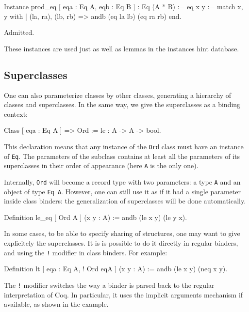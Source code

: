 \begin{coq_example*}
Instance prod_eq [ eqa : Eq A, eqb : Eq B ] : Eq (A * B) :=
  eq x y := match x, y with
  | (la, ra), (lb, rb) => andb (eq la lb) (eq ra rb)
  end.
\end{coq_example*}
\begin{coq_eval}
Admitted.
\end{coq_eval}

These instances are used just as well as lemmas in the instances hint database.


\subsection{Superclasses}
\label{classes:superclasses}
One can also parameterize classes by other classes, generating a
hierarchy of classes and superclasses. In the same way, we give the
superclasses as a binding context:

\begin{coq_example}
Class [ eqa : Eq A ] => Ord :=
  le : A -> A -> bool.
\end{coq_example}

This declaration means that any instance of the \texttt{Ord} class must
have an instance of \texttt{Eq}. The parameters of the subclass contains
at least all the parameters of its superclasses in their order of
appearance (here \texttt{A} is the only one). 

Internally, \texttt{Ord} will become a record type with two parameters:
a type \texttt{A} and an object of type \texttt{Eq A}. However, one can
still use it as if it had a single parameter inside class binders: the
generalization of superclasses will be done automatically. 
\begin{coq_example}
Definition le_eq [ Ord A ] (x y : A) :=
  andb (le x y) (le y x).
\end{coq_example}

In some cases, to be able to specify sharing of structures, one may want to give
explicitely the superclasses. It is is possible to do it directly in regular
binders, and using the \texttt{!} modifier in class binders. For
example:

\begin{coq_example*}
Definition lt [ eqa : Eq A, ! Ord eqA ] (x y : A) :=
  andb (le x y) (neq x y).
\end{coq_example*}

The \texttt{!} modifier switches the way a binder is parsed back to the
regular interpretation of Coq. In particular, it uses the implicit
arguments mechanism if available, as shown in the example.

